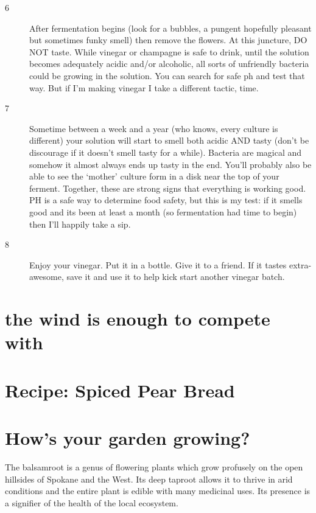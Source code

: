 \documentclass[10pt,a6paper,footinclude=false,firstfoot=false,headinclude=true,open=any,DIV=6]{scrbook} %
\begin{document}
\begin{description}
\item [6] After fermentation begins (look for a bubbles, a pungent hopefully pleasant but sometimes funky smell) then remove the flowers. At this juncture, DO NOT taste. While vinegar or champagne is safe to drink, until the solution becomes adequately acidic and/or alcoholic, all sorts of unfriendly bacteria could be growing in the solution. You can search for safe ph and test that way. But if I'm making vinegar I take a different tactic, time.
\item [7] Sometime between a week and a year (who knows, every culture is different) your solution will start to smell both acidic AND tasty (don't be discourage if it doesn't smell tasty for a while). Bacteria are magical and somehow it almost always ends up tasty in the end. You'll probably also be able to see the ‘mother' culture form in a disk near the top of your ferment. Together, these are strong signs that everything is working good. PH is a safe way to determine food safety, but this is my test: if it smells good and its been at least a month (so fermentation had time to begin) then I'll happily take a sip.
\item [8] Enjoy your vinegar. Put it in a bottle. Give it to a friend. If it tastes extra-awesome, save it and use it to help kick start another vinegar batch.

\end{description}

\chapter{the wind is enough to compete with}


\chapter{Recipe: Spiced Pear Bread}


\chapter{How's your garden growing?}


\newpage
\thispagestyle{empty}

\begin{center}
\begin{minipage}{0.6\textwidth}

\vspace{1em}
\noindent The balsamroot is a genus of flowering plants which grow profusely on the open hillsides of Spokane and the West. Its deep taproot allows it to thrive in arid conditions and the entire plant is edible with many medicinal uses. Its presence is a signifier of the health of the local ecosystem.
\end{minipage}
\end{center}
\end{document}
